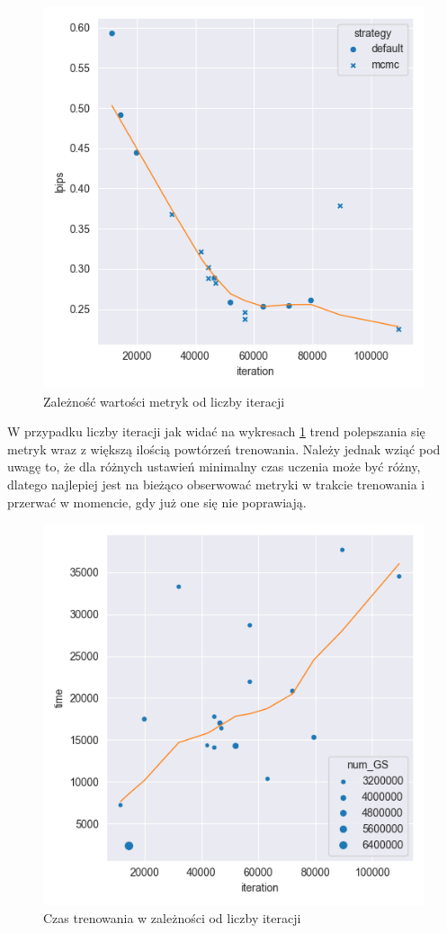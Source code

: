 \begin{figure}[h!]
\begin{minipage}{0.3\textwidth}
    \end{minipage}
    \hfill
    \begin{minipage}{0.3\textwidth}
        \centering
        \includegraphics[width=\textwidth]{img/gs_metrics/lpips_iteration.png}
    \end{minipage}
    \caption{Zależność wartości metryk od liczby iteracji}
    \label{fig:iter_gs_metrics}
\end{figure}

W przypadku liczby iteracji jak widać na wykresach \ref{fig:iter_gs_metrics} trend polepszania się metryk wraz z większą ilością powtórzeń trenowania. Należy jednak wziąć pod uwagę to, że dla różnych ustawień minimalny czas uczenia może być różny, dlatego najlepiej jest na bieżąco obserwować metryki w trakcie trenowania i przerwać w momencie, gdy już one się nie poprawiają. 

\begin{figure}[!h]
    \centering
    \includegraphics[width=0.6\linewidth]{img/gs_metrics/time_iteration.png}
    \caption{Czas trenowania w zależności od liczby iteracji}
    \label{fig:metrics_4}
\end{figure}

